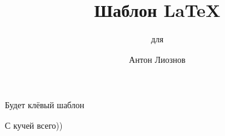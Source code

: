 \documentclass[14pt, aspectratio=43]{beamer}
\begin{document}
    \title{Шаблон \LaTeX}
    \subtitle{для \CSC}  %
    \author{Антон Лиознов}
    \institute{\CSC}  %
    \date{\the\year}
    \frame{\titlepage}
    
    \begin{frame}{Будет клёвый шаблон}\relax
    
        С кучей всего))
         
    \end{frame}
\end{document}
